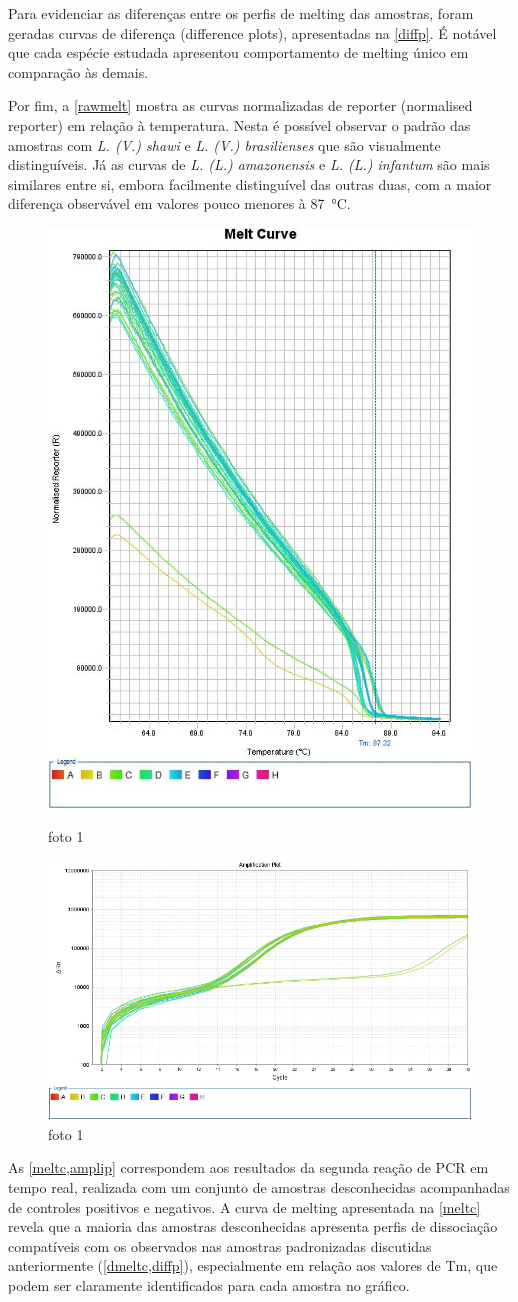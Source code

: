 Para evidenciar as diferenças entre os perfis de melting das
amostras, foram geradas curvas de diferença (difference plots), apresentadas na
\cref{diffp}. 
É notável que cada espécie estudada
apresentou comportamento de melting único em comparação às demais. 

Por fim, a \cref{rawmelt} mostra as curvas normalizadas de reporter (normalised
reporter) em relação à
temperatura. Nesta é possível observar o padrão das amostras com \textit{L. (V.) shawi} e
\textit{L. (V.) brasilienses} que são visualmente distinguíveis. Já as curvas de
\textit{L. (L.) amazonensis} e \textit{L. (L.) infantum} são mais similares
entre si, embora facilmente distinguível das outras duas,  com
a maior diferença observável em valores pouco menores à \qty{87}{\celsius}.

\begin{figure}
        \centering
        \includegraphics[width=.4\textwidth]{fig/Melt Curve.jpg}
        \caption{foto 1}
        \label{meltc}
        \includegraphics[width=.4\textwidth]{fig/Amplification Plot.jpg}
        \caption{foto 1}
        \label{amplip}
\end{figure}

As \cref{meltc,amplip} correspondem aos resultados da segunda reação de PCR em tempo real, realizada com um conjunto de amostras desconhecidas acompanhadas de controles positivos e negativos. A curva de melting apresentada na \cref{meltc} revela que a maioria das amostras desconhecidas apresenta perfis de dissociação compatíveis com os observados nas amostras padronizadas discutidas anteriormente (\cref{dmeltc,diffp}), especialmente em relação aos valores de Tm, que podem ser claramente identificados para cada amostra no gráfico.

